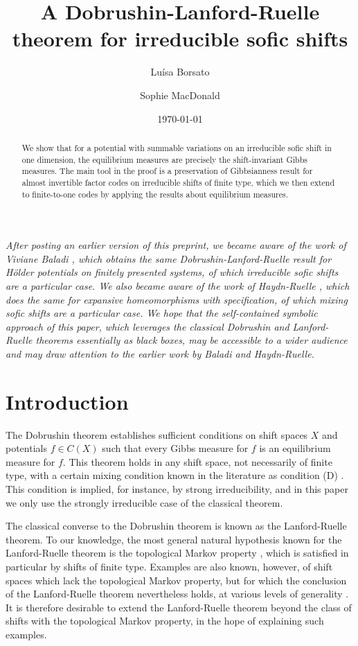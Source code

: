 \documentclass{amsproc}
\title{A Dobrushin-Lanford-Ruelle theorem for irreducible sofic shifts}
\author{Lu{\'i}sa Borsato}
\author{Sophie MacDonald}
\date{\today}
\numberwithin{theorem}{section}
\theoremstyle{remark}
\theoremstyle{definition}
\theoremstyle{plain}
\begin{document}
\begin{abstract}
    We show that for a potential with summable variations on an irreducible sofic shift in one dimension, the equilibrium measures are precisely the shift-invariant Gibbs measures. The main tool in the proof is a preservation of Gibbsianness result for almost invertible factor codes on irreducible shifts of finite type, which we then extend to finite-to-one codes by applying the results about equilibrium measures.
\end{abstract}

\maketitle

\textit{After posting an earlier version of this preprint, we became aware of the work of Viviane Baladi \cite{baladi-1991-finitely-presented}, which obtains the same Dobrushin-Lanford-Ruelle result for H{\"older} potentials on finitely presented systems, of which irreducible sofic shifts are a particular case. We also became aware of the work of Haydn-Ruelle \cite{haydn-ruelle-1992-equivalence}, which does the same for expansive homeomorphisms with specification, of which mixing sofic shifts are a particular case. We hope that the self-contained symbolic approach of this paper, which leverages the  classical Dobrushin and Lanford-Ruelle theorems essentially as black boxes, may be accessible to a wider audience and may draw attention to the earlier work by Baladi and Haydn-Ruelle.}


\section{Introduction}

The  Dobrushin theorem establishes sufficient conditions on shift spaces $X$ and potentials $f \in C(X)$ such that every Gibbs measure for $f$ is an equilibrium measure for $f$. This theorem holds in any shift space, not necessarily of finite type, with a certain mixing condition known in the literature as condition (D) \cite{ruelle-2004-thermo}. This condition is implied, for instance, by strong irreducibility, and in this paper we only use the strongly irreducible case of the classical theorem.

The classical converse to the Dobrushin theorem is known as the Lanford-Ruelle theorem. To our knowledge, the most general natural hypothesis known for the Lanford-Ruelle theorem is the topological Markov property \cite{barbieri2018equivalence}, which is satisfied in particular by shifts of finite type. Examples are also known, however, of shift spaces which lack the topological Markov property, but for which the conclusion of the Lanford-Ruelle theorem nevertheless holds, at various levels of generality \cite{meyerovitch2013gibbs}. It is therefore desirable to extend the Lanford-Ruelle theorem beyond the class of shifts with the topological Markov property, in the hope of explaining such examples.
\end{document}
